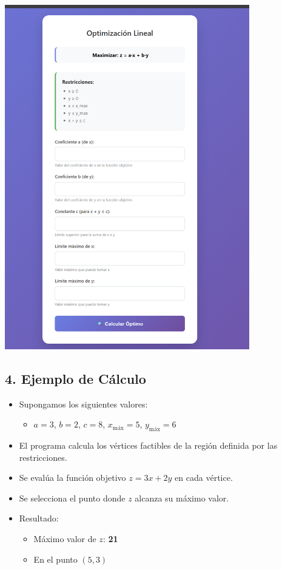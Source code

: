\documentclass[a4paper,10pt]{article}
\begin{document}
\begin{center}
\includegraphics[width=0.8\textwidth]{ejemplo_interfaz .png}
\end{center}

\subsection*{4. Ejemplo de C\'alculo}
\begin{itemize}
  \item Supongamos los siguientes valores:
  \begin{itemize}
    \item $a = 3$, $b = 2$, $c = 8$, $x_{\text{m\'ax}} = 5$, $y_{\text{m\'ax}} = 6$
  \end{itemize}
  \item El programa calcula los v\'ertices factibles de la regi\'on definida por las restricciones.
  \item Se eval\'ua la funci\'on objetivo $z = 3x + 2y$ en cada v\'ertice.
  \item Se selecciona el punto donde $z$ alcanza su m\'aximo valor.
  \item Resultado:
  \begin{itemize}
    \item M\'aximo valor de $z$: \textbf{21}
    \item En el punto $(5, 3)$
  \end{itemize}
\end{itemize}
\end{document}
